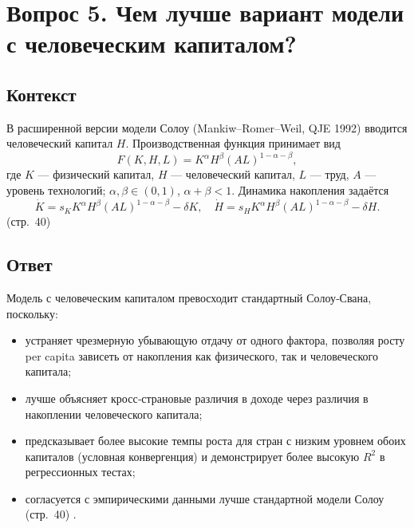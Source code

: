 \section*{Вопрос 5. Чем лучше вариант модели с человеческим капиталом?}

\subsection*{Контекст}
В расширенной версии модели Солоу (Mankiw–Romer–Weil, QJE 1992) вводится человеческий капитал \(H\). Производственная функция принимает вид  
\[
F(K,H,L) = K^\alpha H^\beta (AL)^{1-\alpha-\beta},
\]
где \(K\) — физический капитал, \(H\) — человеческий капитал, \(L\) — труд, \(A\) — уровень технологий; \(\alpha,\beta\in(0,1)\), \(\alpha+\beta<1\). Динамика накопления задаётся  
\[
\dot K = s_K K^\alpha H^\beta (AL)^{1-\alpha-\beta} - \delta K,\quad
\dot H = s_H K^\alpha H^\beta (AL)^{1-\alpha-\beta} - \delta H.
\]
(стр.~40) 

\subsection*{Ответ}
Модель с человеческим капиталом превосходит стандартный Солоу‑Свана, поскольку:
\begin{itemize}
  \item устраняет чрезмерную убывающую отдачу от одного фактора, позволяя росту per capita зависеть от накопления как физического, так и человеческого капитала;
  \item лучше объясняет кросс‑страновые различия в доходе через различия в накоплении человеческого капитала;
  \item предсказывает более высокие темпы роста для стран с низким уровнем обоих капиталов (условная конвергенция) и демонстрирует более высокую \(R^2\) в регрессионных тестах;
  \item согласуется с эмпирическими данными лучше стандартной модели Солоу (стр.~40) .
\end{itemize}
